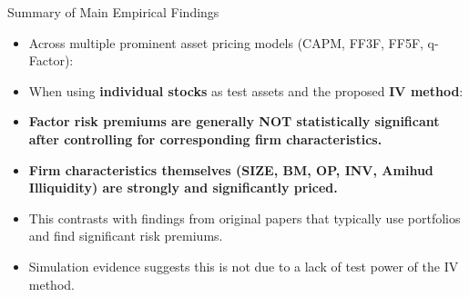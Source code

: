 \documentclass[10pt]{beamer}
\begin{document}

\begin{frame}{Summary of Main Empirical Findings}
  \begin{itemize}
    \item Across multiple prominent asset pricing models (CAPM, FF3F, FF5F, q-Factor):
    \item When using \textbf{individual stocks} as test assets and the proposed \textbf{IV method}:
    \item \textbf{Factor risk premiums are generally NOT statistically significant after controlling for corresponding firm characteristics.}
    \item \textbf{Firm characteristics themselves (SIZE, BM, OP, INV, Amihud Illiquidity) are strongly and significantly priced.}
    \item This contrasts with findings from original papers that typically use portfolios and find significant risk premiums.
    \item Simulation evidence suggests this is not due to a lack of test power of the IV method.
  \end{itemize}
\end{frame}
\end{document}
